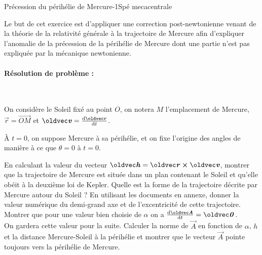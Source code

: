 \begin{exercise}{Précession du périhélie de Mercure}{-1}{Spé}
{meca}{centrale}

Le but de cet exercice est d'appliquer une correction post-newtonienne venant de la théorie de la relativité générale à la trajectoire de Mercure afin d'expliquer l'anomalie de la précession de la périhélie de Mercure dont une partie n'est pas expliquée par la mécanique newtonienne.

\paragraph{Résolution de problème :}~

On considère le Soleil fixé au point $O$, on notera $M$ l'emplacement de Mercure, $\vec{r} = \vec{OM}$ et $\vec{v} = \dv{\vec{r}}{t}$.

À $t = 0$, on suppose Mercure à sa périhélie, et on fixe l'origine des angles de manière à ce que $\theta = 0$ à $t=0$.

\begin{questions}
    \question En calculant la valeur du vecteur $\vec{h} = \vec{r} \cross \vec{v}$, montrer que la trajectoire de Mercure est située dans un plan contenant le Soleil et qu'elle obéit à la deuxième loi de Kepler.
    \question Quelle est la forme de la trajectoire décrite par Mercure autour du Soleil ? En utilisant les documents en annexe, donner la valeur numérique du demi-grand axe et de l'excentricité de cette trajectoire.
    \question Montrer que pour une valeur bien choisie de $\alpha$ on a $\dv{\vec{A}}{t} = \vec{0}$. \\ On gardera cette valeur pour la suite.
    \question Calculer la norme de $\vec{A}$ en fonction de $\alpha$, $h$ et la distance Mercure-Soleil à la périhélie et montrer que le vecteur $\vec{A}$ pointe toujours vers la périhélie de Mercure.
    

\end{questions}
\end{exercise}
